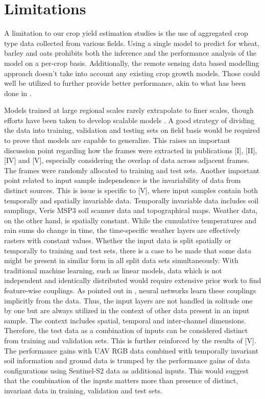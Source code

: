 \section{Limitations}

A limitation to our crop yield estimation studies is the use of aggregated crop type data collected from various fields. Using a single model to predict for wheat, barley and oats prohibits both the inference and the performance analysis of the model on a per-crop basis. Additionally, the remote sensing data based modelling approach doesn't take into account any existing crop growth models. Those could well be utilized to further provide better performance, akin to what has been done in \cite{Borra-Serrano2020}.

Models trained at large regional scales rarely extrapolate to finer scales, though efforts have been taken to develop scalable models \cite{Donohue2018}. A good strategy of dividing the data into training, validation and testing sets on field basis would be required to prove that models are capable to generalize. This raises an important discussion point regarding how the frames were extracted in publications [I], [II], [IV] and [V], especially considering the overlap of data across adjacent frames. The frames were randomly allocated to training and test sets. Another important point related to input sample independence is the invariability of data from distinct sources. This is issue is specific to [V], where input samples contain both temporally and spatially invariable data. Temporally invariable data includes soil samplings, Veris MSP3 soil scanner data and topographical maps. Weather data, on the other hand, is spatially constant. While the cumulative temperatures and rain sums do change in time, the time-specific weather layers are effectively rasters with constant values. Whether the input data is split spatially or temporally to training and test sets, there is a case to be made that some data might be present in similar form in all split data sets simultaneously. With traditional machine learning, such as linear models, data which is not independent and identically distributed would require extensive prior work to find feature-wise couplings. As pointed out in \cite{Sun2019}, neural networks learn these couplings implicitly from the data. Thus, the input layers are not handled in solitude one by one but are always utilized in the context of other data present in an input sample. The context includes spatial, temporal and inter-channel dimensions. Therefore, the test data as a combination of inputs can be considered distinct from training and validation sets. This is further reinforced by the results of [V]. The performance gains with UAV RGB data combined with temporally invariant soil information and ground data is trumped by the performance gains of data configurations using Sentinel-S2 data as additional inputs. This would suggest that the combination of the inputs matters more than presence of distinct, invariant data in training, validation and test sets. 

